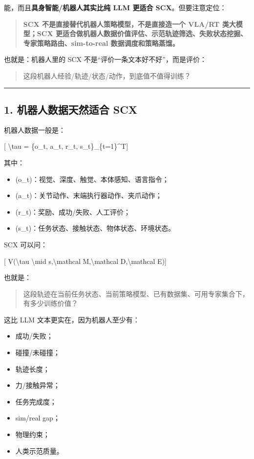 \documentclass[
  12pt,
]{ctexart}
\author{SCX}
\date{2026}
\providecommand{\tightlist}{%
  \setlength{\itemsep}{0pt}\setlength{\parskip}{0pt}}
\begin{document}
能，而且\textbf{具身智能/机器人其实比纯 LLM 更适合 SCX}。但要注意定位：

\begin{quote}
\textbf{SCX 不是直接替代机器人策略模型，不是直接造一个 VLA/RT
类大模型；SCX
更适合做机器人数据价值评估、示范轨迹筛选、失败状态挖掘、专家策略路由、sim-to-real
数据调度和策略蒸馏。}
\end{quote}

也就是：机器人里的 SCX 不是``评价一条文本好不好''，而是评价：

\begin{quote}
这段机器人经验/轨迹/状态/动作，到底值不值得训练？
\end{quote}

\begin{center}\rule{0.5\linewidth}{0.5pt}\end{center}

\subsection{1. 机器人数据天然适合
SCX}\label{ux673aux5668ux4ebaux6570ux636eux5929ux7136ux9002ux5408-scx}

机器人数据一般是：

{[} \textbackslash tau = \{o\_t, a\_t, r\_t, s\_t\}\_\{t=1\}\^{}T{]}

其中：

\begin{itemize}
\tightlist
\item
  (o\_t)：视觉、深度、触觉、本体感知、语言指令；
\item
  (a\_t)：关节动作、末端执行器动作、夹爪动作；
\item
  (r\_t)：奖励、成功/失败、人工评价；
\item
  (s\_t)：任务状态、接触状态、物体状态、环境状态。
\end{itemize}

SCX 可以问：

{[} V(\textbackslash tau \textbackslash mid s,\textbackslash mathcal
M,\textbackslash mathcal D,\textbackslash mathcal E){]}

也就是：

\begin{quote}
这段轨迹在当前任务状态、当前策略模型、已有数据集、可用专家集合下，有多少训练价值？
\end{quote}

这比 LLM 文本更实在，因为机器人至少有：

\begin{itemize}
\tightlist
\item
  成功/失败；
\item
  碰撞/未碰撞；
\item
  轨迹长度；
\item
  力/接触异常；
\item
  任务完成度；
\item
  sim/real gap；
\item
  物理约束；
\item
  人类示范质量。
\end{itemize}
\end{document}
